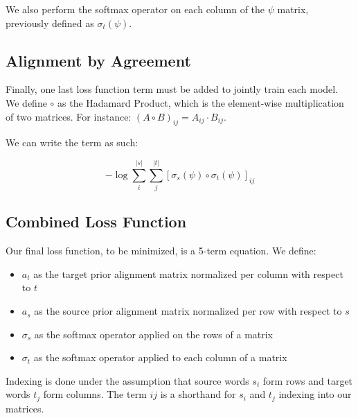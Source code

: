 \documentclass[twoside,twocolumn]{article}
\newlength\mystoreparindent
\newenvironment{myparindent}[1]{%
  \setlength{\mystoreparindent}{\the\parindent}
  \setlength{\parindent}{#1}
  }{%
  \setlength{\parindent}{\mystoreparindent}
}
\begin{document}
\begin{myparindent}{0pt}
We also perform the softmax operator on each column of the $\psi$ matrix,
previously defined as $\sigma_t(\psi)$.


\subsection{Alignment by Agreement}

Finally, one last loss function term must be added to jointly train each model.
We define $\circ$ as the Hadamard Product, which is the element-wise
multiplication of two matrices. For instance:
$(A \circ B)_{ij} = A_{ij} \cdot B_{ij}$.

We can write the term as such:

\begin{equation}
  -\log \sum_i^{|s|} \sum_j^{|t|}
    \left[ \sigma_s(\psi) \circ \sigma_t(\psi) \right]_{ij}
\end{equation}



\subsection{Combined Loss Function}

Our final loss function, to be minimized, is a 5-term equation. We define:
\begin{itemize}[label={}]
  \item $a_t$ as the target prior alignment matrix normalized per column with respect to $t$\\ %
  \item $a_s$ as the source prior alignment matrix normalized per row with respect to $s$\\ %
  \item $\sigma_s$ as the softmax operator applied on the rows of a matrix\\
  \item $\sigma_t$ as the softmax operator applied to each column of a matrix
\end{itemize}

Indexing is done under the assumption that source words $s_i$ form rows
and target words $t_j$ form columns. The term $ij$ is a shorthand
for $s_i$ and $t_j$ indexing into our matrices.


\end{myparindent}
\end{document}
